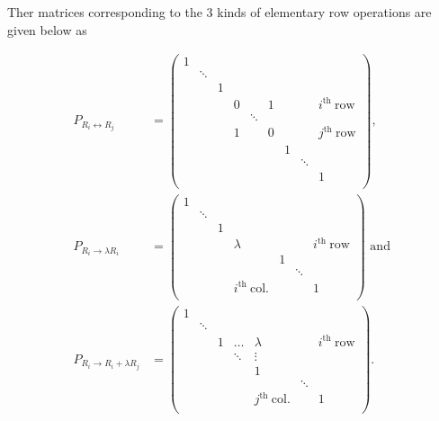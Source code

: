 \documentclass[a4paper,12pt]{report}
\begin{document}
\begin{appendices}
Ther matrices corresponding to the 3 kinds of elementary row operations are given below as

\begin{equation}
    \begin{aligned}
    P_{R_{i} \leftrightarrow R_{j}  } &= \begin{pmatrix}
        1 &  &  &  &  &  &  &  &   \\
         & \ddots  &  &  &  &  &  &  &   \\
         &  & 1 &  &  &  &  &  &   \\
         &  &  & 0 &  & 1 &  &  & i^{\text{th }}\text{row}    \\
         &  &  &  & \ddots  &  &  &  &   \\
         &  &  & 1 &  & 0 &  &  & j^{\text{th }}\text{row}   \\
         &  &  &  &  &  & 1 &  &   \\
         &  &  &  &  &  &  & \ddots  &   \\
         &  &  &  &  &  &  &  &  1 \\
    \end{pmatrix}, \\
    P_{R_{i} \rightarrow \lambda R_{i}  } &= \begin{pmatrix}
        1 &  &  &  &  &  &   \\
         & \ddots  &  &  &  &  &   \\
         &  & 1 &  &  &  &   \\
         &  &  & \lambda  &  &  & i^{\text{th }}\text{row}   \\
         &  &  &  & 1 &  &   \\
         &  &  &  &  & \ddots  &   \\
         &  &  & i^{\text{th }}\text{col.}  &  &  &  1 \\
    \end{pmatrix} \text { and } \\
    P_{R_{i} \rightarrow R_{i}+\lambda R_{j}   } &= \begin{pmatrix}
        1 &  &  &  &  &  &   \\
         & \ddots  &  &  &  &  &   \\
         &  & 1 & \ldots  & \lambda  &  & i^{\text{th }}\text{row}   \\
         &  &  & \ddots  & \vdots  &  &   \\
         &  &  &  & 1 &  &   \\
         &  &  &  &  & \ddots  &   \\
         &  &  &  & j^{\text{th }}\text{col.}  &  & 1  \\
    \end{pmatrix} .
    \end{aligned}
\end{equation}






\end{appendices}
\end{document}
